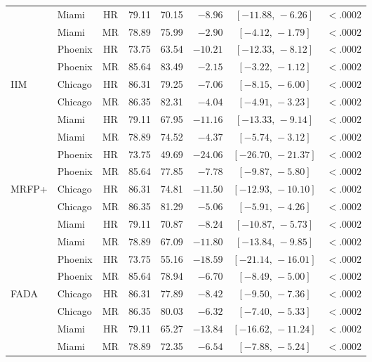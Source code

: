 \begin{table}[h]
\begin{tabular}{@{}llcrrrcr@{}}
          & Miami   & HR & 79.11 & 70.15 & $-8.96$  & $[-11.88,\,-6.26]$  & $<\!.0002$ \\
          & Miami   & MR & 78.89 & 75.99 & $-2.90$  & $[-4.12,\,-1.79]$   & $<\!.0002$ \\
          & Phoenix & HR & 73.75 & 63.54 & $-10.21$ & $[-12.33,\,-8.12]$  & $<\!.0002$ \\
          & Phoenix & MR & 85.64 & 83.49 & $-2.15$  & $[-3.22,\,-1.12]$   & $<\!.0002$ \\
\cmidrule(l){1-8}
IIM       & Chicago & HR & 86.31 & 79.25 & $-7.06$  & $[-8.15,\,-6.00]$   & $<\!.0002$ \\
          & Chicago & MR & 86.35 & 82.31 & $-4.04$  & $[-4.91,\,-3.23]$   & $<\!.0002$ \\
          & Miami   & HR & 79.11 & 67.95 & $-11.16$ & $[-13.33,\,-9.14]$  & $<\!.0002$ \\
          & Miami   & MR & 78.89 & 74.52 & $-4.37$  & $[-5.74,\,-3.12]$   & $<\!.0002$ \\
          & Phoenix & HR & 73.75 & 49.69 & $-24.06$ & $[-26.70,\,-21.37]$ & $<\!.0002$ \\
          & Phoenix & MR & 85.64 & 77.85 & $-7.78$  & $[-9.87,\,-5.80]$   & $<\!.0002$ \\
\cmidrule(l){1-8}
MRFP+     & Chicago & HR & 86.31 & 74.81 & $-11.50$ & $[-12.93,\,-10.10]$ & $<\!.0002$ \\
          & Chicago & MR & 86.35 & 81.29 & $-5.06$  & $[-5.91,\,-4.26]$   & $<\!.0002$ \\
          & Miami   & HR & 79.11 & 70.87 & $-8.24$  & $[-10.87,\,-5.73]$  & $<\!.0002$ \\
          & Miami   & MR & 78.89 & 67.09 & $-11.80$ & $[-13.84,\,-9.85]$  & $<\!.0002$ \\
          & Phoenix & HR & 73.75 & 55.16 & $-18.59$ & $[-21.14,\,-16.01]$ & $<\!.0002$ \\
          & Phoenix & MR & 85.64 & 78.94 & $-6.70$  & $[-8.49,\,-5.00]$   & $<\!.0002$ \\
\cmidrule(l){1-8}
FADA      & Chicago & HR & 86.31 & 77.89 & $-8.42$  & $[-9.50,\,-7.36]$   & $<\!.0002$ \\
          & Chicago & MR & 86.35 & 80.03 & $-6.32$  & $[-7.40,\,-5.33]$   & $<\!.0002$ \\
          & Miami   & HR & 79.11 & 65.27 & $-13.84$ & $[-16.62,\,-11.24]$ & $<\!.0002$ \\
          & Miami   & MR & 78.89 & 72.35 & $-6.54$  & $[-7.88,\,-5.24]$   & $<\!.0002$ \\

\end{tabular}
\end{table}
